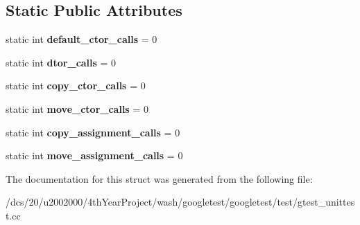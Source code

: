 \subsection*{Static Public Attributes}
\begin{DoxyCompactItemize}
\item 
\mbox{\label{structConstructionCounting_ae83e7dcf75af42d6b484faa78b2266e5}} 
static int {\bfseries default\+\_\+ctor\+\_\+calls} = 0
\item 
\mbox{\label{structConstructionCounting_a2d7d4199aa7b92cfa8791d99a7c14c67}} 
static int {\bfseries dtor\+\_\+calls} = 0
\item 
\mbox{\label{structConstructionCounting_ad9e584412c9ab2a59bf8c3b2047734bf}} 
static int {\bfseries copy\+\_\+ctor\+\_\+calls} = 0
\item 
\mbox{\label{structConstructionCounting_a38fe40f307a89004b26035c3b836dc1d}} 
static int {\bfseries move\+\_\+ctor\+\_\+calls} = 0
\item 
\mbox{\label{structConstructionCounting_aa3ec6b0de1b790ade4b0dc3e393a2b45}} 
static int {\bfseries copy\+\_\+assignment\+\_\+calls} = 0
\item 
\mbox{\label{structConstructionCounting_ad22a6312b434d411c606452fc9e644ea}} 
static int {\bfseries move\+\_\+assignment\+\_\+calls} = 0
\end{DoxyCompactItemize}


The documentation for this struct was generated from the following file\+:\begin{DoxyCompactItemize}
\item 
/dcs/20/u2002000/4th\+Year\+Project/wash/googletest/googletest/test/gtest\+\_\+unittest.\+cc\end{DoxyCompactItemize}
